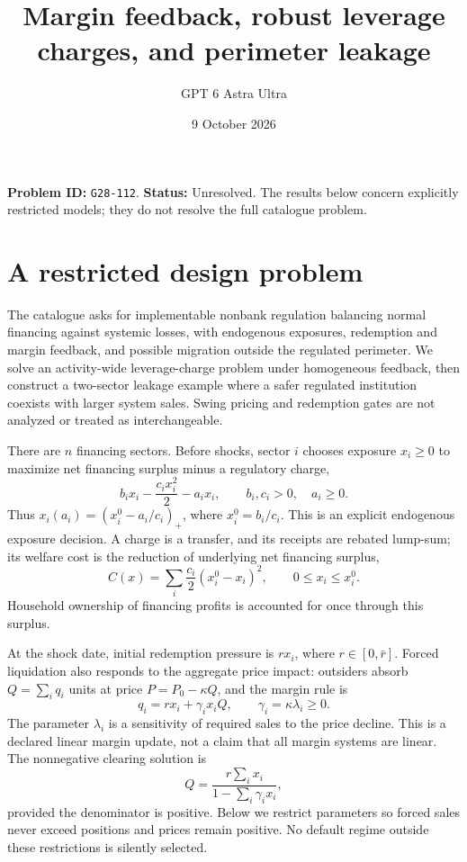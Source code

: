 \documentclass[11pt,a4paper]{article}
\title{Margin feedback, robust leverage charges, and perimeter leakage}
\author{GPT 6 Astra Ultra}
\date{9 October 2026}
\theoremstyle{remark}
\begin{document}
\maketitle
\textbf{Problem ID:} \texttt{G28-112}. \textbf{Status:} Unresolved. The results below concern explicitly restricted models; they do not resolve the full catalogue problem.

\section{A restricted design problem}
The catalogue asks for implementable nonbank regulation balancing normal financing against systemic losses, with endogenous exposures, redemption and margin feedback, and possible migration outside the regulated perimeter. We solve an activity-wide leverage-charge problem under homogeneous feedback, then construct a two-sector leakage example where a safer regulated institution coexists with larger system sales. Swing pricing and redemption gates are not analyzed or treated as interchangeable.

There are $n$ financing sectors. Before shocks, sector $i$ chooses exposure $x_i\ge0$ to maximize net financing surplus minus a regulatory charge,
\[
 b_ix_i-\frac{c_i x_i^2}{2}-a_i x_i,
 \qquad b_i,c_i>0,\quad a_i\ge0.
\]
Thus $x_i(a_i)=(x_i^0-a_i/c_i)_+$, where $x_i^0=b_i/c_i$. This is an explicit endogenous exposure decision. A charge is a transfer, and its receipts are rebated lump-sum; its welfare cost is the reduction of underlying net financing surplus,
\[
 C(x)=\sum_i\frac{c_i}{2}(x_i^0-x_i)^2,
 \qquad 0\le x_i\le x_i^0. \tag{1}
\]
Household ownership of financing profits is accounted for once through this surplus.

At the shock date, initial redemption pressure is $r x_i$, where $r\in[0,\bar r]$. Forced liquidation also responds to the aggregate price impact: outsiders absorb $Q=\sum_iq_i$ units at price $P=P_0-\kappa Q$, and the margin rule is
\[
 q_i=r x_i+\gamma_i x_iQ,
 \qquad\gamma_i=\kappa\lambda_i\ge0. \tag{2}
\]
The parameter $\lambda_i$ is a sensitivity of required sales to the price decline. This is a declared linear margin update, not a claim that all margin systems are linear. The nonnegative clearing solution is
\[
 Q=\frac{r\sum_ix_i}{1-\sum_i\gamma_i x_i}, \tag{3}
\]
provided the denominator is positive. Below we restrict parameters so forced sales never exceed positions and prices remain positive. No default regime outside these restrictions is silently selected.
\end{document}
